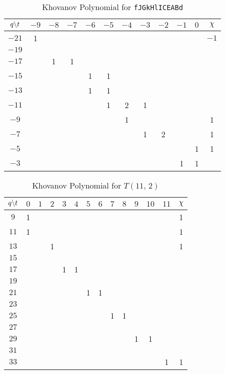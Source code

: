 \begin{table}
    \centering
    \begin{tabular}{| c | c | c | c | c | c | c | c | c | c | c | c |}
        \hline
        $q\symbol{92}t$&$-9$&$-8$&$-7$&$-6$&$-5$&$-4$&$-3$&$-2$&$-1$&$0$&$\chi$\\
        \hline
        $-21$&1&&&&&&&&&&$-1$\\
        \hline
        $-19$&&&&&&&&&&&\\
        \hline
        $-17$&&1&1&&&&&&&&\\
        \hline
        $-15$&&&&1&1&&&&&&\\
        \hline
        $-13$&&&&1&1&&&&&&\\
        \hline
        $-11$&&&&&1&2&1&&&&\\
        \hline
        $-9$&&&&&&1&&&&&1\\
        \hline
        $-7$&&&&&&&1&2&&&1\\
        \hline
        $-5$&&&&&&&&&&1&1\\
        \hline
        $-3$&&&&&&&&&1&1&\\
        \hline
    \end{tabular}
    \caption{Khovanov Polynomial for \texttt{fJGkHlICEABd}}
    \label{table:fJGkHlICEABd_kho}
\end{table}
\begin{table}
    \centering
    \begin{tabular}{| c | c | c | c | c | c | c | c | c | c | c | c | c | c |}
        \hline
        $q\symbol{92}t$&$0$&$1$&$2$&$3$&$4$&$5$&$6$&$7$&$8$&$9$&$10$&$11$&$\chi$\\
        \hline
        $9$&1&&&&&&&&&&&&1\\
        \hline
        $11$&1&&&&&&&&&&&&1\\
        \hline
        $13$&&&1&&&&&&&&&&1\\
        \hline
        $15$&&&&&&&&&&&&&\\
        \hline
        $17$&&&&1&1&&&&&&&&\\
        \hline
        $19$&&&&&&&&&&&&&\\
        \hline
        $21$&&&&&&1&1&&&&&&\\
        \hline
        $23$&&&&&&&&&&&&&\\
        \hline
        $25$&&&&&&&&1&1&&&&\\
        \hline
        $27$&&&&&&&&&&&&&\\
        \hline
        $29$&&&&&&&&&&1&1&&\\
        \hline
        $31$&&&&&&&&&&&&&\\
        \hline
        $33$&&&&&&&&&&&&1&1\\
        \hline
    \end{tabular}
    \caption{Khovanov Polynomial for $T(11,\,2)$}
    \label{table:t_2_11_kho}
\end{table}
